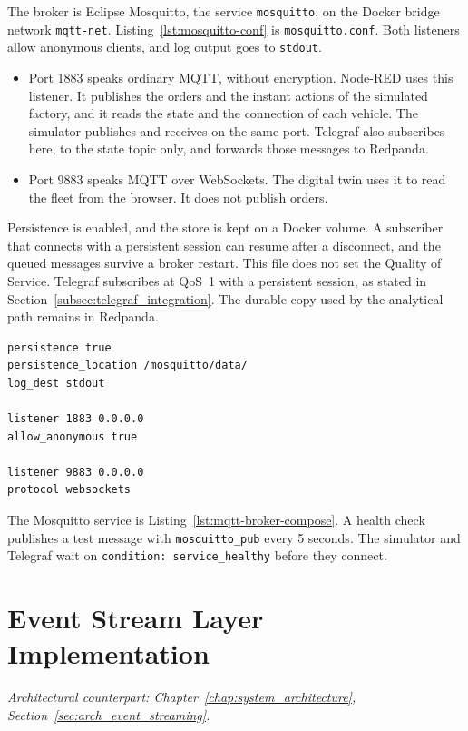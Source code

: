 The broker is Eclipse Mosquitto, the service \texttt{mosquitto}, on the Docker bridge network \texttt{mqtt-net}. Listing~\ref{lst:mosquitto-conf} is \texttt{mosquitto.conf}. Both listeners allow anonymous clients, and log output goes to \texttt{stdout}.

\begin{itemize}
    \item Port 1883 speaks ordinary MQTT, without encryption. Node-RED uses this listener. It publishes the orders and the instant actions of the simulated factory, and it reads the state and the connection of each vehicle. The simulator publishes and receives on the same port. Telegraf also subscribes here, to the state topic only, and forwards those messages to Redpanda.
    \item Port 9883 speaks MQTT over WebSockets. The digital twin uses it to read the fleet from the browser. It does not publish orders.
\end{itemize}

Persistence is enabled, and the store is kept on a Docker volume. A subscriber that connects with a persistent session can resume after a disconnect, and the queued messages survive a broker restart. This file does not set the Quality of Service. Telegraf subscribes at QoS~1 with a persistent session, as stated in Section~\ref{subsec:telegraf_integration}. The durable copy used by the analytical path remains in Redpanda.

\begin{lstlisting}[language=configToml, caption={Mosquitto configuration (mosquitto.conf)}, label={lst:mosquitto-conf}, basicstyle=\ttfamily\small, breaklines=true]
persistence true
persistence_location /mosquitto/data/
log_dest stdout

listener 1883 0.0.0.0
allow_anonymous true

listener 9883 0.0.0.0
protocol websockets
\end{lstlisting}

The Mosquitto service is Listing~\ref{lst:mqtt-broker-compose}. A health check publishes a test message with \texttt{mosquitto\_pub} every 5 seconds. The simulator and Telegraf wait on \texttt{condition: service\_healthy} before they connect.


\section{Event Stream Layer Implementation}
\label{sec:event_stream_implementation}
\textit{Architectural counterpart: Chapter~\ref{chap:system_architecture}, Section~\ref{sec:arch_event_streaming}.}

